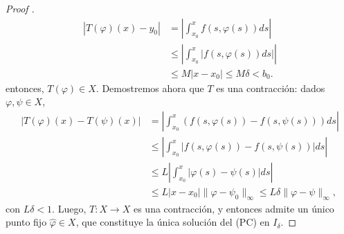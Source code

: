 \documentclass[a4paper]{report}
\begin{document}
\begin{proof}[Proof ]
	\begin{align*}
		|T(\varphi)(x)-y_{0}| & = \left| \int_{x_{0}}^{x} f(s,\varphi(s))ds \right| \\ 
		& \leq \left| \int_{x_{0}}^{x} |f(s,\varphi(s))ds| \right| \\
		& \leq M |x-x_{0}| \leq M\delta < b_0
	.\end{align*}
	entonces, $T(\varphi) \in X$.
	Demostremos ahora que $T$ es una contracción: dados $\varphi,\psi \in X$, 
	\begin{align*}
		|T(\varphi)(x)-T(\psi)(x)| & = \left| \int_{x_{0}}^{x} (f(s,\varphi(s))-f(s,\psi(s)))ds \right| \\
		& \leq \left| \int_{x_{0}}^{x} |f(s,\varphi(s))-f(s,\psi(s))| ds \right| \\
		& \leq L \left| \int_{x_{0}}^{x}|\varphi(s)-\psi(s)|ds \right| \\
		& \leq L|x-x_{0}| \| \varphi - \psi_0 \|_{\infty} \leq L \delta \| \varphi - \psi \|_{\infty},
	\end{align*}
	con $L\delta<1$. Luego, $T: X \to X$ es una contracción, y entonces admite un único punto fijo $\hat{\varphi} \in X$, que constituye la única solución del (PC) en $I_{\delta}$. 
\end{proof}





\end{document}
